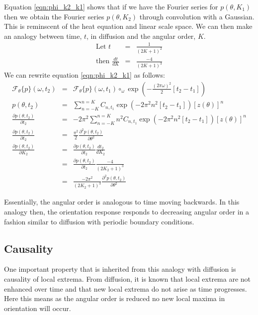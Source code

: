 \documentclass{article}
\begin{document}
Equation \ref{eqn:phi_k2_k1} shows that if we have the Fourier series for $ p(\theta,K_1) $ then we obtain the Fourier series $ p(\theta,K_2) $ through convolution with a Gaussian. This is reminscent of the heat equation and linear scale space. We can then make an analogy between time, $ t $, in diffusion and the angular order, $ K $.
\begin{eqnarray} 
	\mbox{Let } t & = & \frac{1}{(2K+1)^2} \\
	\mbox{then } \frac{dt}{dK} & = & \frac{-4}{(2K+1)^3} 
\end{eqnarray}
We can rewrite equation \ref{eqn:phi_k2_k1} as follows:
\begin{eqnarray}
	\mathcal{F}_\theta \{ p \} (\omega,t_2) & = & \mathcal{F}_\theta \{ p \} (\omega,t_1)  \circ_\omega \exp\left(- \frac{(2\pi\omega)^2}{2}  \left[ t_2 - t_1 \right] \right) \\
	p(\theta,t_2) & = & \sum_{n=-K}^{n=K} C_{n,t_1} \exp(-2\pi^2 n^2 \left[t_2-t_1\right]) \left[ z(\theta) \right]^n  \\
	\frac{\partial p(\theta,t_2)}{\partial t_2} & = & -2 \pi^2 \sum_{n=-K}^{n=K} n^2 C_{n,t_1} \exp(-2\pi^2 n^2 \left[t_2-t_1\right]) \left[ z(\theta) \right]^n  \\
	\frac{\partial p(\theta,t_2)}{\partial t_2} & = & \frac{\pi^2}{2} \frac{\partial^2 p(\theta, t_2)}{\partial \theta^2} \label{eqn:heateqn} \\
	\frac{\partial p(\theta,t_2)}{\partial K_2} & = & \frac{\partial p(\theta,t_2)}{\partial t_2} \frac{dt_2}{dK_2}  \\
	& = &  \frac{\partial p(\theta,t_2)}{\partial t_2} \frac{-4}{(2K_2+1)^3} \\
	& = &  \frac{-2 \pi^2 }{(2K_2+1)^3} \frac{\partial^2 p(\theta, t_2)}{\partial \theta^2} 
\end{eqnarray}

Essentially, the angular order is analogous to time moving backwards. In this analogy then, the orientation response responds to decreasing angular order in a fashion similar to diffusion with periodic boundary conditions.

\subsection{Causality}
One important property that is inherited from this analogy with diffusion is causality of local extrema. From diffusion, it is known that local extrema are not enhanced over time and that new local extrema do not arise as time progresses. Here this means as the angular order is reduced no new local maxima in orientation will occur.
\end{document}
